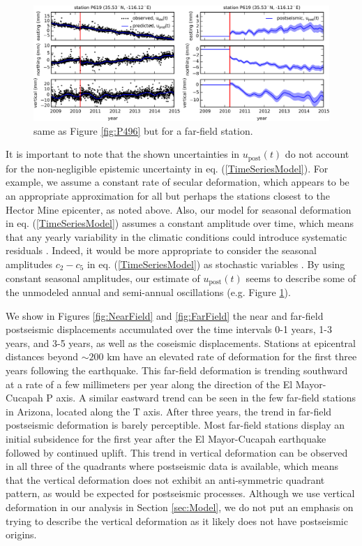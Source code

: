 \documentclass[draft,linenumbers]{AGUJournal}
\begin{document}
\begin{figure}
\noindent\includegraphics[scale=0.9]{Figures/FilterP619}
\centering
\caption{same as Figure \ref{fig:P496} but for a far-field station.} 
\label{fig:P619}
\end{figure}

It is important to note that the shown uncertainties in $u_\mathrm{post}(t)$ do not account for the non-negligible epistemic uncertainty in eq. (\ref{TimeSeriesModel}).  For example, we assume a constant rate of secular deformation, which appears to be an appropriate approximation for all but perhaps the stations closest to the Hector Mine epicenter, as noted above.  Also, our model for seasonal deformation in eq. (\ref{TimeSeriesModel}) assumes a constant amplitude over time, which means that any yearly variability in the climatic conditions could introduce systematic residuals \citep{Davis2012}. Indeed, it would be more appropriate to consider the seasonal amplitudes $c_2-c_5$ in eq. (\ref{TimeSeriesModel}) as stochastic variables \citep{Murray2005}. By using constant seasonal amplitudes, our estimate of $u_\mathrm{post}(t)$ seems to describe some of the unmodeled annual and semi-annual oscillations (e.g. Figure \ref{fig:P619}).          

We show in Figures \ref{fig:NearField} and \ref{fig:FarField} the near and far-field postseismic displacements accumulated over the time intervals 0-1 years, 1-3 years, and 3-5 years, as well as the coseismic displacements.  Stations at epicentral distances beyond ${\sim}200$ km have an elevated rate of deformation for the first three years following the earthquake.  This far-field deformation is trending southward at a rate of a few millimeters per year along the direction of the El Mayor-Cucapah P axis.  A similar eastward trend can be seen in the few far-field stations in Arizona, located along the T axis.  After three years, the trend in far-field postseismic deformation is barely perceptible.  Most far-field stations display an initial subsidence for the first year after the El Mayor-Cucapah earthquake followed by continued uplift.  This trend in vertical deformation can be observed in all three of the quadrants where postseismic data is available, which means that the vertical deformation does not exhibit an anti-symmetric quadrant pattern, as would be expected for postseismic processes.  Although we use vertical deformation in our analysis in Section \ref{sec:Model},  we do not put an emphasis on trying to describe the vertical deformation as it likely does not have postseismic origins.        
\end{document}
